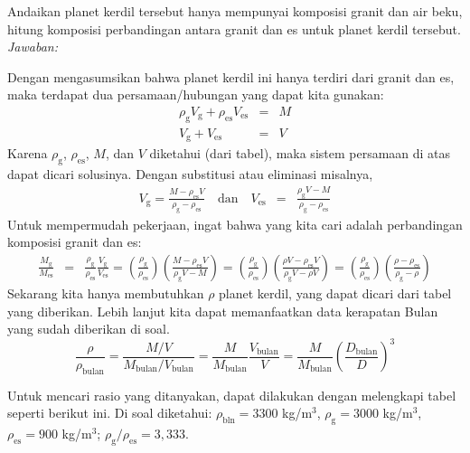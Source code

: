 \documentclass[11pt,fleqn]{exam}
\begin{document}
\begin{questions}
Andaikan planet kerdil tersebut hanya mempunyai komposisi granit dan air beku, hitung komposisi perbandingan antara granit dan es untuk planet kerdil tersebut.\\

\textit{Jawaban: } 

Dengan mengasumsikan bahwa planet kerdil ini hanya terdiri dari granit dan es, maka terdapat dua persamaan/hubungan yang dapat kita gunakan:
\begin{eqnarray*}
\rho_{\text{g}} V_{\text{g}} + \rho_{\text{es}} V_{\text{es}} &=& M\\
V_{\text{g}} + V_{\text{es}} &=& V
\end{eqnarray*}
Karena $\rho_{\text{g}}$, $\rho_{\text{es}}$, $M$, dan $V$ diketahui (dari tabel), maka sistem persamaan di atas dapat dicari solusinya. Dengan substitusi atau eliminasi misalnya, 
\begin{eqnarray*}
V_{\text{g}} = \frac{M - \rho_{\text{es}} V}{\rho_{\text{g}} - \rho_{\text{es}} }\quad \text{dan} \quad V_{\text{es}} &=& \frac{\rho_{\text{g}} V - M}{\rho_{\text{g}} - \rho_{\text{es}} }
\end{eqnarray*}
Untuk mempermudah pekerjaan, ingat bahwa yang kita cari adalah perbandingan komposisi granit dan es:
\begin{eqnarray*}
\frac{M_{\text{g}}}{M_{\text{es}}} &=& \frac{\rho_{\text{g}}}{\rho_{\text{es}}}\frac{V_{\text{g}}}{V_{\text{es}}} = \left(\frac{\rho_{\text{g}}}{\rho_{\text{es}}}\right) \left(\frac{M - \rho_{\text{es}} V}{\rho_{\text{g}} V - M}\right) = \left(\frac{\rho_{\text{g}}}{\rho_{\text{es}}}\right) \left(\frac{\rho V - \rho_{\text{es}} V}{\rho_{\text{g}} V - \rho V}\right) = \left(\frac{\rho_{\text{g}}}{\rho_{\text{es}}}\right) \left(\frac{\rho - \rho_{\text{es}}}{\rho_{\text{g}} - \rho}\right)
\end{eqnarray*}
Sekarang kita hanya membutuhkan $\rho$ planet kerdil, yang dapat dicari dari tabel yang diberikan. Lebih lanjut kita dapat memanfaatkan data kerapatan Bulan yang sudah diberikan di soal.
$$\frac{\rho}{\rho_{\text{bulan}}} = \frac{M/V}{M_{\text{bulan}}/V_{\text{bulan}}} = \frac{M}{M_{\text{bulan}}} \frac{V_{\text{bulan}}}{V} = \frac{M}{M_{\text{bulan}}} \left(\frac{D_{\text{bulan}}}{D}\right)^{3}$$

Untuk mencari rasio yang ditanyakan, dapat dilakukan dengan melengkapi tabel seperti berikut ini. Di soal diketahui: $\rho_{\text{bln}} = 3300$ kg/m$^3$, $\rho_{\text{g}} = 3000$ kg/m$^3$, $\rho_{\text{es}} = 900$ kg/m$^3$; $\rho_{\text{g}} / \rho_{\text{es}} = 3,333$. 


\end{questions}
\end{document}
